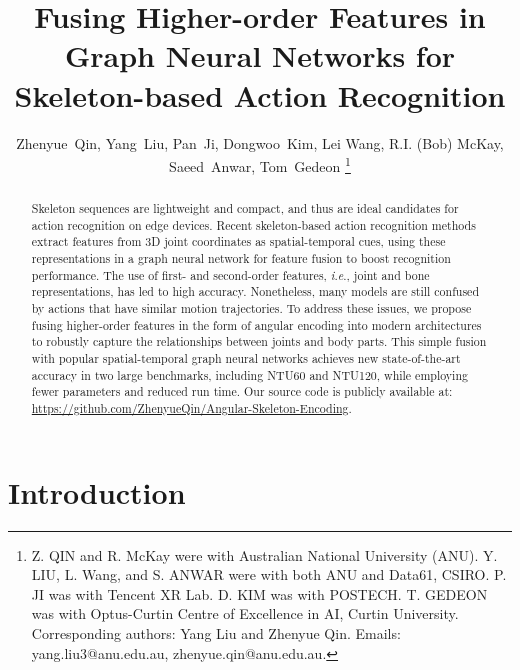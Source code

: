 \documentclass[journal,comsoc]{IEEEtran}
\newcommand{\ie}{\textit{i}.\textit{e}.,}
\begin{document}
\title{
Fusing Higher-order Features in Graph Neural Networks for 
Skeleton-based Action Recognition
}

\author{Zhenyue~Qin,
        Yang~Liu,
        Pan~Ji, 
        Dongwoo~Kim, 
        Lei Wang, 
        R.I. (Bob) McKay, 
        Saeed~Anwar,
        Tom~Gedeon
\thanks{Z. QIN and R. McKay were with Australian National University (ANU). Y. LIU, L. Wang, and S. ANWAR were with both ANU and Data61, CSIRO. P. JI was with Tencent XR Lab. D. KIM was with POSTECH. T. GEDEON was with Optus-Curtin Centre of Excellence in AI, Curtin University. Corresponding authors: Yang Liu and Zhenyue Qin. Emails: yang.liu3@anu.edu.au, zhenyue.qin@anu.edu.au.}}


\maketitle

\begin{abstract}
Skeleton sequences are lightweight and compact, and thus are ideal candidates for action recognition on edge devices. Recent skeleton-based action recognition methods extract features from 3D joint coordinates as spatial-temporal cues, using these representations in a graph neural network for feature fusion to boost recognition performance. The use of first- and second-order features, \ie{} joint and bone representations, has led to high accuracy. Nonetheless, many models are still confused by actions that have similar motion trajectories. To address these issues, we propose fusing higher-order features in the form of angular encoding into modern architectures to robustly capture the relationships between joints and body parts. This simple fusion with popular spatial-temporal graph neural networks achieves new state-of-the-art accuracy in two large benchmarks, including NTU60 and NTU120, while employing fewer parameters and reduced run time. Our source code is publicly available at: 
\href{https://github.com/ZhenyueQin/Angular-Skeleton-Encoding}{https://github.com/ZhenyueQin/Angular-Skeleton-Encoding}.

 \end{abstract}




\IEEEpeerreviewmaketitle

\section{Introduction}
\label{sec:Intro}
\end{document}
